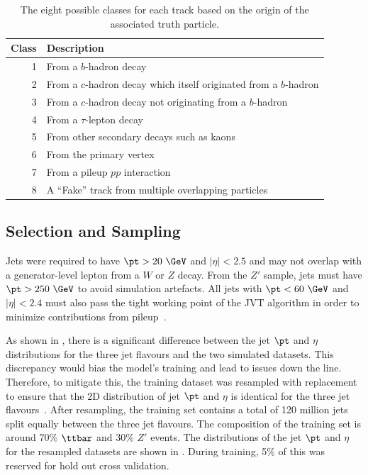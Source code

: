 \begin{table}
    \centering
    \begin{tabular}{rl}
        \toprule
        Class & Description \\
        \midrule
        1 & From a $b$-hadron decay \\
        2 & From a $c$-hadron decay which itself originated from a $b$-hadron \\
        3 & From a $c$-hadron decay not originating from a $b$-hadron \\
        4 & From a $\tau$-lepton decay \\
        5 & From other secondary decays such as kaons \\
        6 & From the primary vertex \\
        7 & From a pileup $pp$ interaction \\
        8 & A ``Fake'' track from multiple overlapping particles \\
        \bottomrule
    \end{tabular}
    \caption{The eight possible classes for each track based on the origin of the associated truth particle.}
    \label{tab:track_labels}
\end{table}

\subsection{Selection and Sampling}

Jets were required to have $\pt > 20~\GeV$ and $|\eta| < 2.5$ and may not overlap with a generator-level lepton from a $W$ or $Z$ decay.
From the $Z'$ sample, jets must have $\pt > 250~\GeV$ to avoid simulation artefacts.
All jets with $\pt < 60~\GeV$ and $|\eta| < 2.4$ must also pass the tight working point of the JVT algorithm in order to minimize contributions from pileup~\cite{JVT}.

As shown in , there is a significant difference between the jet $\pt$ and $\eta$ distributions for the three jet flavours and the two simulated datasets.
This discrepancy would bias the model's training and lead to issues down the line.
Therefore, to mitigate this, the training dataset was resampled with replacement to ensure that the 2D distribution of jet $\pt$ and $\eta$ is identical for the three jet flavours~\cite{AlexThesis}.
After resampling, the training set contains a total of 120 million jets split equally between the three jet flavours.
The composition of the training set is around 70\% $\ttbar$ and 30\% $Z'$ events.
The distributions of the jet $\pt$ and $\eta$ for the resampled datasets are shown in .
During training, 5\% of this was reserved for hold out cross validation.


